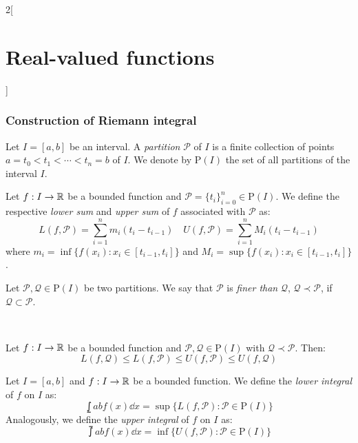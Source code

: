 \documentclass[../../../main.tex]{subfiles}
\begin{document}
\begin{multicols}{2}[\section{Real-valued functions}]
  \subsubsection{Construction of Riemann integral}
  \begin{definition}
    Let $I=[a,b]$ be an interval. A \emph{partition} $\mathcal{P}$ of $I$ is a finite collection of points $a=t_0<t_1<\cdots<t_n=b$ of $I$. We denote by $\mathrm{P}(I)$ the set of all partitions of the interval $I$.
  \end{definition}
  \begin{definition}
    Let $f:I\rightarrow\mathbb{R}$ be a bounded function and $\mathcal{P}=\{t_i\}_{i=0}^n\in\mathrm{P}(I)$. We define the respective \emph{lower sum} and \emph{upper sum} of $f$ associated with $\mathcal{P}$ as:
    $$L(f,\mathcal{P})=\sum_{i=1}^nm_i(t_i-t_{i-1})\quad U(f,\mathcal{P})=\sum_{i=1}^nM_i(t_i-t_{i-1})$$
    where $m_i=\inf\{f(x_i):x_i\in[t_{i-1},t_i]\}$ and $M_i=\sup\{f(x_i):x_i\in[t_{i-1},t_i]\}$.
  \end{definition}
  \begin{definition}
    Let $\mathcal{P},\mathcal{Q}\in\mathrm{P}(I)$ be two partitions. We say that $\mathcal{P}$ is \emph{finer than} $\mathcal{Q}$, $\mathcal{Q}\prec\mathcal{P}$, if $\mathcal{Q}\subset\mathcal{P}$.
  \end{definition}
  \begin{center}
    \begin{minipage}{\linewidth}
      \centering
      \\
      
    \end{minipage}
  \end{center}
  \begin{proposition}
    Let $f:I\rightarrow\mathbb{R}$ be a bounded function and $\mathcal{P},\mathcal{Q}\in\mathrm{P}(I)$ with $\mathcal{Q}\prec\mathcal{P}$. Then: $$L(f,\mathcal{Q})\leq L(f,\mathcal{P})\leq U(f,\mathcal{P})\leq U(f,\mathcal{Q})$$
  \end{proposition}
  \begin{definition}
    Let $I=[a,b]$ and $f:I\rightarrow\mathbb{R}$ be a bounded function. We define the \emph{lower integral} of $f$ on $I$ as: $$\lowint{a}{b}f(x)\dd{x}=\sup\{L(f,\mathcal{P}):\mathcal{P}\in\mathrm{P}(I)\}$$ Analogously, we define the \emph{upper integral} of $f$ on $I$ as: $$\upint{a}{b}f(x)\dd{x}=\inf\{U(f,\mathcal{P}):\mathcal{P}\in\mathrm{P}(I)\}$$

\end{definition}
\end{multicols}
\end{document}
